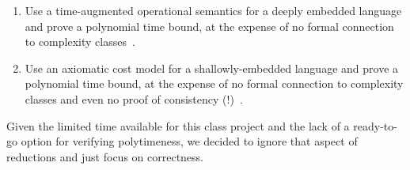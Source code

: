 \documentclass{article}
\begin{document}
\begin{enumerate}
\item Use a time-augmented operational semantics for a deeply embedded language
  and prove a polynomial time bound, at the expense of no formal connection to
  complexity classes~\cite{machine15,timl17}.

\item Use an axiomatic cost model for a shallowly-embedded language and prove a
  polynomial time bound, at the expense of no formal connection to complexity
  classes and even no proof of consistency (!)~\cite{fcf15}.
\end{enumerate}
Given the limited time available for this class project and the lack of a
ready-to-go option for verifying polytimeness, we decided to ignore that aspect
of reductions and just focus on correctness.
\end{document}
